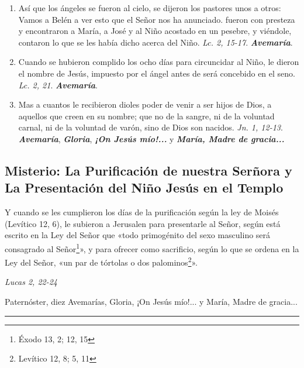 \documentclass[./rosary.tex]{subfiles}
\newcounter{joyful-counter}
\begin{document}
\begin{enumerate}
      \item Así que los ángeles se fueron al cielo, se dijeron los pastores unos a otros: Vamos a Belén a ver esto que el Señor nos ha anunciado. fueron
            con presteza y encontraron a María, a José y al Niño acostado en un pesebre, y viéndole, contaron lo que se les había dicho acerca del
            Niño. \emph{Lc. 2, 15-17}. \textbf{\emph{Avemaría}}.


      \item Cuando se hubieron complido los ocho días para circuncidar al Niño, le dieron el nombre de Jesús, impuesto por el ángel antes de será concebido en el seno.
            \emph{Lc. 2, 21}. \textbf{\emph{Avemaría}}.

      \item Mas a cuantos le recibieron dioles poder de venir a ser hijos de Dios, a aquellos que creen en su nombre; que no de la sangre, ni de la voluntad carnal,
            ni de la voluntad de varón, sino de Dios son nacidos. \emph{Jn. 1, 12-13}.
            \textbf{\emph{Avemaría}}, \textbf{\emph{Gloria}}, \textbf{\emph{¡On Jesús mío!...}} y \textbf{\emph{María, Madre de gracia...}}
\end{enumerate}

\bigskip

\subsection*{ Misterio: La Purificación de nuestra Serñora y La Presentación del Niño Jesús en el Templo}

Y cuando se les cumplieron los días de la purificación según la ley de Moisés (Levítico 12, 6),
le subieron a Jerusalen para presentarle al Señor, según está escrito en la Ley del Señor que «todo primogénito
del sexo masculino será consagrado al Señor\footnote{Éxodo 13, 2; 12, 15\label{primogenito}}», y para ofrecer como sacrificio,
según lo que se ordena en la Ley del Señor, «un par de tórtolas o dos palominos\footnote{Levítico 12, 8; 5, 11\label{sacrificio}}».
\begin{flushright}
      \emph{Lucas 2, 22-24}
\end{flushright}

Paternóster, diez Avemarías, Gloria, ¡On Jesús mío!... y María, Madre de gracia...

\rule{\textwidth}{0.5pt}
\end{document}
